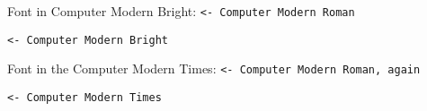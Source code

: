 \documentclass[12pt]{report}
\begin{document}
\large

{\selectfont Font in Computer Modern Bright:}
\texttt{<- Computer Modern Roman}
\par\blindtext \texttt{<- Computer Modern Bright}

{\selectfont Font in the Computer Modern Times:}
\texttt{<- Computer Modern Roman, again}
{\selectfont\par\blindtext} \texttt{<- Computer Modern
  Times}
\end{document}
